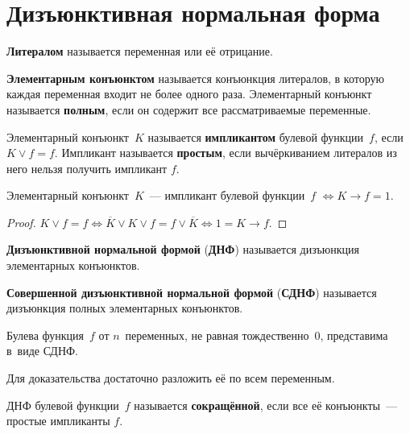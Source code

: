 \section{Дизъюнктивная нормальная форма}
 \textbf{Литералом} называется переменная или её отрицание.

 \textbf{Элементарным конъюнктом} называется конъюнкция литералов, в которую каждая переменная входит не более одного раза.
Элементарный конъюнкт называется \textbf{полным}, если он содержит все рассматриваемые переменные.

 Элементарный конъюнкт~$K$ называется \textbf{импликантом} булевой функции~$f$, если $K \lor f = f$.
Импликант называется \textbf{простым}, если вычёркиванием литералов из него нельзя получить импликант $f$.

\begin{statement}
Элементарный конъюнкт~$K$~--- импликант булевой функции~$f$ $\Leftrightarrow K \rightarrow f = 1$.
\end{statement}
\begin{proof}
$K \lor f = f \Leftrightarrow
\overline K \lor K \lor f = f \lor \overline K \Leftrightarrow
1 = K \rightarrow f$.
\end{proof}

 \textbf{Дизъюнктивной нормальной формой} (\textbf{ДНФ}) называется дизъюнкция элементарных конъюнктов.

 \textbf{Совершенной дизъюнктивной нормальной формой} (\textbf{СДНФ}) называется дизъюнкция полных элементарных конъюнктов.

\begin{statement}
Булева функция~$f$ от $n$~переменных, не равная тождественно~$0$, представима в~виде СДНФ.
\end{statement}%
Для доказательства достаточно разложить её по всем переменным.

ДНФ булевой функции~$f$ называется \textbf{сокращённой}, если все её конъюнкты~--- простые импликанты $f$.

